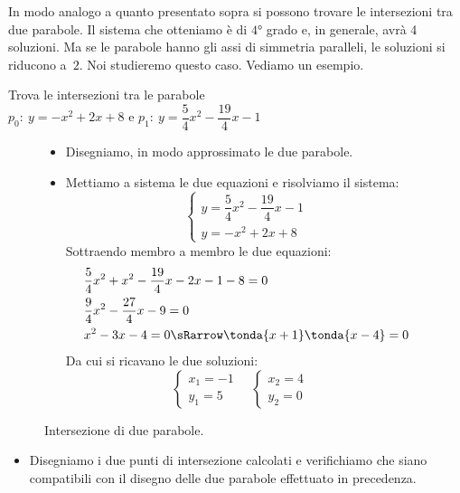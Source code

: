 In modo analogo a quanto presentato sopra si possono trovare le intersezioni 
tra due parabole. Il sistema che otteniamo è di \(4\text{°}\) grado e, in 
generale, avrà 4 soluzioni. Ma se le parabole hanno gli assi di simmetria 
paralleli, le soluzioni si riducono a~\(2\). Noi studieremo questo caso.
Vediamo un esempio.

\begin{esempio}
 Trova le intersezioni tra le parabole \\
 \(p_0:~y=-x^2+2x+8\) e 
 \(p_1:~y=\dfrac{5}{4}x^2-\dfrac{19}{4}x-1\)
 
\begin{figure}[h!]
\begin{minipage}{.63\textwidth}
 \begin{itemize}
  \item Disegniamo, in modo approssimato le due parabole.
  \item Mettiamo a sistema le due equazioni e risolviamo il sistema:
\[\left\{\begin{array}{l}
  y=\dfrac{5}{4}x^2-\dfrac{19}{4}x-1\\
  y=-x^2+2x+8
\end{array}\right.\]
Sottraendo membro a membro le due equazioni:
\begin{align*}
&\dfrac{5}{4}x^2+x^2-\dfrac{19}{4}x-2x-1-8=0 \\
&\dfrac{9}{4}x^2-\dfrac{27}{4}x-9=0 \\
&x^2-3x-4=0 \sRarrow \tonda{x+1}\tonda{x-4} = 0
\end{align*}
   Da cui si ricavano le due soluzioni:
\[\left\{\begin{array}{l}
  x_1=-1\\
  y_1=5
\end{array}\right. \quad
\left\{\begin{array}{l}
  x_2=4\\
  y_2=0
\end{array}\right. \quad
\]
 \end{itemize}
\end{minipage}
\hfill
\begin{minipage}{.35\textwidth}
\begin{inaccessibleblock}[Parabola di equazione \(y=x^2\).]
\centering
 \scalebox{.8}{\intersezioniparabole}
  \caption{Intersezione di due parabole.} \label{fig:parabola_parabolaparabola}
\end{inaccessibleblock}
\end{minipage}
\end{figure}
\begin{itemize}
  \item Disegniamo i due punti di intersezione calcolati e 
verifichiamo che siano compatibili con il disegno delle due parabole 
effettuato in precedenza.
\end{itemize}

\end{esempio}

